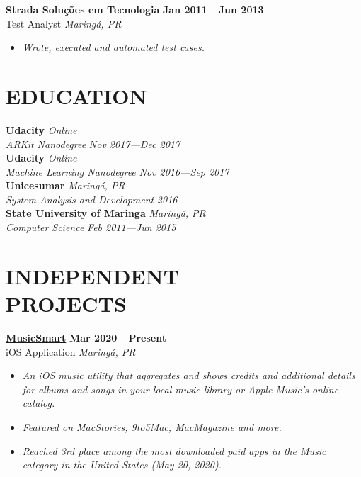 \documentclass[line,margin]{res}
\begin{document}
\begin{resume}
  {\bf Strada Solu\c{c}\~oes em Tecnologia} \hfill {\bf Jan 2011---Jun 2013} \\
  Test Analyst \hfill {\sl Maring\'a, PR}\\[-6pt]
    \begin{itemize}
    \item {\sl Wrote, executed and automated test cases.}
  \end{itemize}


\section{EDUCATION}
  {\bf Udacity} \hfill {\sl Online} \\
  {\sl ARKit Nanodegree} \hfill {\sl Nov 2017---Dec 2017}\\[6pt]
  {\bf Udacity} \hfill {\sl Online} \\
  {\sl Machine Learning Nanodegree} \hfill {\sl Nov 2016---Sep 2017}\\[6pt]
  {\bf Unicesumar} \hfill {\sl Maring\'a, PR} \\
  {\sl System Analysis and Development} \hfill {\sl 2016}\\[6pt]
  {\bf State University of Maringa} \hfill {\sl Maring\'a, PR} \\
  {\sl Computer Science} \hfill {\sl Feb 2011---Jun 2015}


\section{INDEPENDENT \\ PROJECTS}
  {\bf \href{https://apps.apple.com/us/app/musicsmart/id1512195368}{MusicSmart}} \hfill {\bf Mar 2020---Present} \\
  iOS Application \hfill {\sl Maring\'a, PR}\\[-6pt]
    \begin{itemize}
    \item {\sl An iOS music utility that aggregates and shows credits and additional details for albums and songs in your local music library or Apple Music’s online catalog.}
    \item {\sl Featured on \href{https://www.macstories.net/reviews/musicsmart-puts-the-spotlight-on-music-credits/}{MacStories}, \href{https://9to5mac.com/2020/05/19/musicsmart-apple-music-app/}{9to5Mac}, \href{https://macmagazine.uol.com.br/post/2020/05/21/aplicativo-brasileiro-musicsmart-traz-detalhes-aprofundados-sobre-as-cancoes-do-apple-music/}{MacMagazine} and \href{https://twitter.com/chockenberry/status/1262803700658999296}{more}.}
    \item {\sl Reached 3rd place among the most downloaded paid apps in the Music category in the United States (May 20, 2020).}
    \end{itemize}
  

\end{resume}
\end{document}
